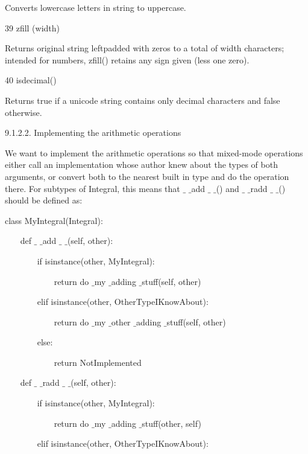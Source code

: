 Converts lowercase letters in string to uppercase. \par
39 \hspace*{0.5in} zfill (width) \par
\vspace{12pt}
Returns original string leftpadded with zeros to a total of width characters; intended for numbers, zfill() retains any sign given (less one zero). \par
40 \hspace*{0.5in} isdecimal() \par
\vspace{12pt}
Returns true if a unicode string contains only decimal characters and false otherwise. \par
\vspace{12pt}
9.1.2.2. Implementing the arithmetic operations \par
We want to implement the arithmetic operations so that mixed-mode operations either call an implementation whose author knew about the types of both arguments, or convert both to the nearest built in type and do the operation there. For subtypes of Integral, this means that  $  \_  $ $  \_  $add $  \_  $ $  \_  $() and  $  \_  $ $  \_  $radd $  \_  $ $  \_  $() should be defined as: \par
class MyIntegral(Integral): \par
\vspace{12pt}
~~~ def  $  \_  $ $  \_  $add $  \_  $ $  \_  $(self, other): \par
~~~~~~~ if isinstance(other, MyIntegral): \par
~~~~~~~~~~~ return do $  \_  $my $  \_  $adding $  \_  $stuff(self, other) \par
~~~~~~~ elif isinstance(other, OtherTypeIKnowAbout): \par
~~~~~~~~~~~ return do $  \_  $my $  \_  $other $  \_  $adding $  \_  $stuff(self, other) \par
~~~~~~~ else: \par
~~~~~~~~~~~ return NotImplemented \par
\vspace{12pt}
~~~ def  $  \_  $ $  \_  $radd $  \_  $ $  \_  $(self, other): \par
~~~~~~~ if isinstance(other, MyIntegral): \par
~~~~~~~~~~~ return do $  \_  $my $  \_  $adding $  \_  $stuff(other, self) \par
~~~~~~~ elif isinstance(other, OtherTypeIKnowAbout): \par
